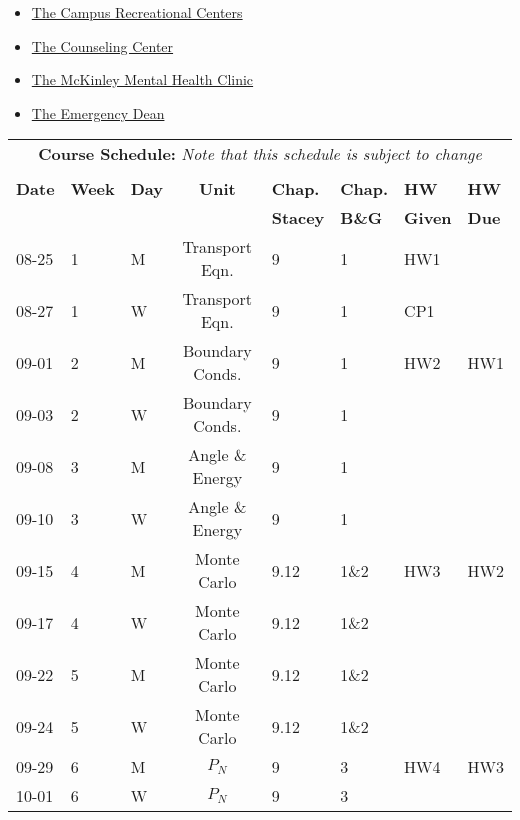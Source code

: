 \documentclass[11pt, a4paper]{article}
\begin{document}
\begin{itemize}
\item \href{https://campusrec.illinois.edu/}{The Campus Recreational Centers}
\item \href{http://counselingcenter.illinois.edu/}{The Counseling Center}
\item \href{http://odos.illinois.edu/emergency/}{The McKinley Mental Health Clinic}
\item \href{https://odos.illinois.edu/community-of-care/emergency-dean}{The Emergency Dean}
\end{itemize}


\pagebreak
\FloatBarrier
\renewcommand{\arraystretch}{1}
\begin{table}[h]
\begin{center}
\begin{tabular}{lllcllll}
\multicolumn{8}{c}{\textbf{Course Schedule:}\textit{ Note that this schedule is subject to change}}\\
&&&&&&&\\
\textbf{Date} & \textbf{Week} & \textbf{Day} & \textbf{Unit} & \textbf{Chap.} & \textbf{Chap.} & \textbf{HW} & \textbf{HW}\\
              &  &  & & \textbf{Stacey}& \textbf{B\&G} & \textbf{Given} & \textbf{Due}\\
\hline
\hline
08-25 & 1 & M  & Transport Eqn.          & 9    & 1    & HW1 &     \\
08-27 & 1 & W  & Transport Eqn.          & 9    & 1    & CP1 &     \\
09-01 & 2 & M  & Boundary Conds.         & 9    & 1    & HW2 & HW1 \\
09-03 & 2 & W  & Boundary Conds.         & 9    & 1    &     &     \\
09-08 & 3 & M  & Angle \& Energy         & 9    & 1    &     &     \\
09-10 & 3 & W  & Angle \& Energy         & 9    & 1    &     &     \\
09-15 & 4 & M  & Monte Carlo             & 9.12 & 1\&2 & HW3 & HW2 \\
09-17 & 4 & W  & Monte Carlo             & 9.12 & 1\&2 &     &     \\
09-22 & 5 & M  & Monte Carlo             & 9.12 & 1\&2 &     &     \\
09-24 & 5 & W  & Monte Carlo             & 9.12 & 1\&2 &     &     \\
09-29 & 6 & M  & $P_N$                   & 9    & 3    & HW4 & HW3 \\
10-01 & 6 & W  & $P_N$                   & 9    & 3    &     &     \\

\end{tabular}
\end{center}
\end{table}
\end{document}
